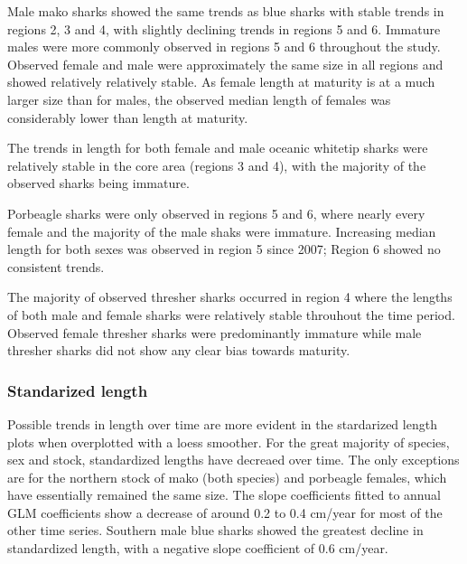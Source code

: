 \documentclass[12pt]{SCreport}
\begin{document}
Male mako sharks showed the same trends as blue sharks with stable trends in regions 2, 3 and 4, with slightly declining trends in regions 5 and 6. Immature males were more commonly observed in regions 5 and 6 throughout the study.  Observed female and male were approximately the same size in all regions and showed relatively relatively stable.  As female length at maturity is at a much larger size than for males, the observed median length of females was considerably lower than  length at maturity.

The trends in length for both female and male oceanic whitetip sharks were relatively stable in the core area (regions 3 and 4),  with the majority of the observed sharks being immature.  

Porbeagle sharks were only observed in regions 5 and 6, where nearly every female and the majority of the male shaks were immature.  Increasing median length for both sexes was observed in region 5 since 2007; Region 6 showed no consistent trends.

The majority of observed thresher sharks occurred in region 4 where the lengths of both male and female sharks were relatively stable throuhout the time period. Observed female thresher sharks were predominantly immature while male thresher sharks did not show any clear bias towards maturity.

\subsubsection{Standarized length}
Possible trends in length over time are more evident in the stardarized length plots when overplotted with a loess smoother.  For the great majority of species, sex and stock, standardized lengths have decreaed over time.  The only exceptions are for the northern stock of mako (both species) and porbeagle females, which have essentially remained the same size.  The slope coefficients fitted to annual GLM coefficients show a decrease of around 0.2 to 0.4 cm/year for most of the other time series.  Southern male blue sharks showed the greatest decline in standardized length, with a negative slope coefficient of 0.6 cm/year.

      
\end{document}

